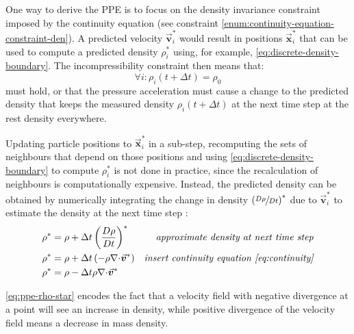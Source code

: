 \documentclass[oneside, a4paper]{book}
\newcommand\vek[1]{\vec{\bm{#1}}}
\newcommand\br[1]{\left(#1\right)}
\newcommand\divergence{{\nabla\cdot}}
\begin{document}
    One way to derive the PPE is to focus on the density invariance constraint imposed by the continuity equation (see constraint \ref{enum:continuity-equation-constraint-den}). A predicted velocity $\vek{v}_i^*$ would result in positions $\vek{x}_i^*$ that can be used to compute a predicted density $\rho_i^*$ using, for example, \autoref{eq:discrete-density-boundary}. The incompressibility constraint then means that:
    \begin{equation}\label{eq:ppe-incompressibility-constraint}
      \forall i: \rho_i\br{t+\Delta t}=\rho_0
    \end{equation} 
    must hold, or that the pressure acceleration must cause a change to the predicted density that keeps the measured density $\rho_i\br{t+\Delta t}$ at the next time step at the rest density everywhere.
    
    Updating particle positions to $\vek{x}_i^*$ in a sub-step, recomputing the sets of neighbours that depend on those positions and using \autoref{eq:discrete-density-boundary} to compute $\rho_i^*$ is not done in practice, since the recalculation of neighbours is computationally expensive. Instead, the predicted density can be obtained by numerically integrating the change in density $\br{\sfrac{D\rho}{Dt}}^*$ due to $\vek{v}_i^*$ to estimate the density at the next time step \autocite{tutorial2019}:
    \begin{align}
      \rho^* &= \rho + \Delta t \br{\frac{D\rho}{D t}}^* &\textit{approximate density at next time step}\\
      \rho^*&=\rho + \Delta t \br{-\rho\divergence\vek{v}^*} &\textit{insert continuity equation \ref{eq:continuity}}\\
      \rho^* &= \rho - \Delta t \rho \divergence \vek{v}^* \label{eq:ppe-rho-star}
    \end{align}

    \autoref{eq:ppe-rho-star} encodes the fact that a velocity field with negative divergence at a point will see an increase in density, while positive divergence of the velocity field means a decrease in mass density. 
\end{document}
